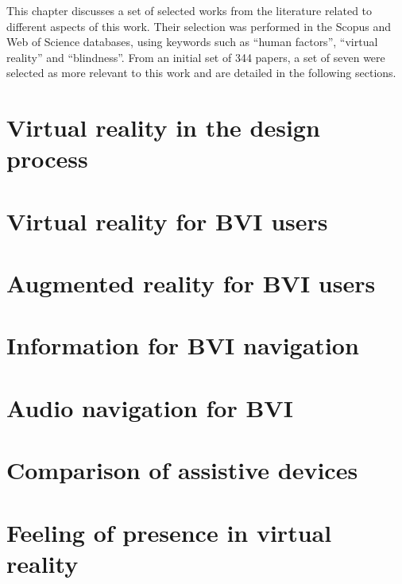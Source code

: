 This chapter discusses a set of selected works from the literature related to different aspects of this work. Their selection was performed in the Scopus and Web of Science databases, using keywords such as “human factors”, “virtual reality” and “blindness”. From an initial set of 344 papers, a set of seven were selected as more relevant to this work and are detailed in the following sections.

\section{Virtual reality in the design process}
\label{sec:vr_cabin}


\section{Virtual reality for BVI users}
\label{sec:vr_without_vision}


\section{Augmented reality for BVI users}
\label{sec:ar_without_vision}


\section{Information for BVI navigation}
\label{sec:bradley_dunlop}


\section{Audio navigation for BVI}
\label{sec:auditory_navigation}


\section{Comparison of assistive devices}
\label{sec:evaluation_spatial_display}


\section{Feeling of presence in virtual reality}
\label{sec:emotion_presence_vr}


